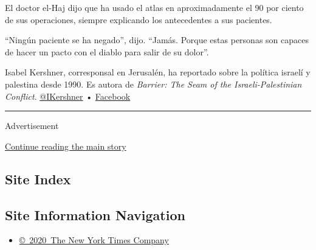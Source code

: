 El doctor el-Haj dijo que ha usado el atlas en aproximadamente el 90 por
ciento de sus operaciones, siempre explicando los antecedentes a sus
pacientes.

``Ningún paciente se ha negado'', dijo. ``Jamás. Porque estas personas
son capaces de hacer un pacto con el diablo para salir de su dolor''.

Isabel Kershner, corresponsal en Jerusalén, ha reportado sobre la
política israelí y palestina desde 1990. Es autora de \emph{Barrier: The
Seam of the Israeli-Palestinian Conflict}.
\href{https://twitter.com/IKershner}{@IKershner} •
\href{https://www.facebookcorewwwi.onion/100013443257747}{Facebook}

\begin{center}\rule{0.5\linewidth}{\linethickness}\end{center}

Advertisement

\protect\hyperlink{after-bottom}{Continue reading the main story}

\hypertarget{site-index}{%
\subsection{Site Index}\label{site-index}}

\hypertarget{site-information-navigation}{%
\subsection{Site Information
Navigation}\label{site-information-navigation}}

\begin{itemize}
\tightlist
\item
  \href{https://help.nytimes3xbfgragh.onion/hc/en-us/articles/115014792127-Copyright-notice}{©~2020~The
  New York Times Company}
\end{itemize}

